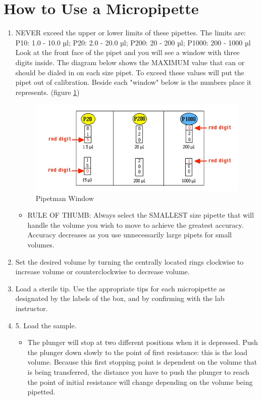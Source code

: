 \documentclass[12pt]{../SOP3_beta}\usepackage[]{graphicx}\usepackage[]{color}
\begin{document}
\section {How to Use a Micropipette}
\begin{enumerate}
  \item NEVER exceed the upper or lower limits of these pipettes.
The limits are:  P10: 1.0 - 10.0 µl; P20: 2.0 - 20.0 µl; P200: 20 - 200 µl; P1000: 200 - 1000 µl  
Look at the front face of the pipet and you will see a window with three digits inside. The diagram below shows the MAXIMUM value that can or should be dialed in on each size pipet. To exceed these values will put the pipet out of calibration. Beside each "window" below is the numbers place it represents. (figure \ref{fig:pipetman})
\begin{figure} [H!]
\caption{Pipetman Window}
\label{fig:pipetman}
\includegraphics{pipetman2.jpg}
\end{figure}
\begin{itemize}
  \item RULE OF THUMB: Always select the SMALLEST size pipette that will handle the volume you wish to move to achieve the greatest accuracy. Accuracy decreases as you use unnecessarily large pipets for small volumes.   
\end{itemize}
\item Set the desired volume by turning the centrally located rings clockwise to increase volume or counterclockwise to decrease volume.  
\item Load a sterile tip. Use the appropriate tips for each micropipette as designated by the labels of the box, and by confirming with the lab instructor. 
\item 5.	 Load the sample. 
\begin{itemize}
  \item The plunger will stop at two different positions when it is depressed. Push the plunger down slowly to the point of first resistance: this is the load volume. Because this first stopping point is dependent on the volume that is being transferred, the distance you have to push the plunger to reach the point of initial resistance will change depending on the volume being pipetted. 

\end{itemize}
\end{enumerate}
\end{document}
